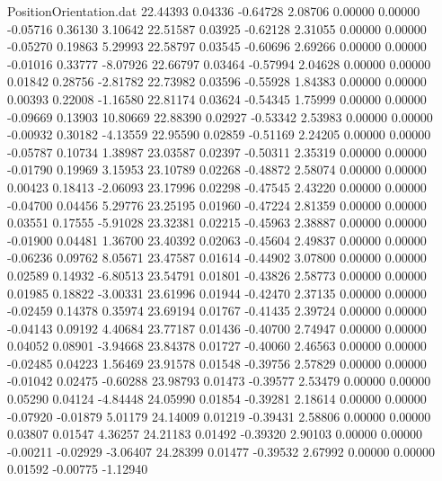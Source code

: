 \begin{filecontents}{PositionOrientation.dat}
  22.44393    0.04336   -0.64728     2.08706    0.00000    0.00000   -0.05716    0.36130    3.10642
  22.51587    0.03925   -0.62128     2.31055    0.00000    0.00000   -0.05270    0.19863    5.29993
  22.58797    0.03545   -0.60696     2.69266    0.00000    0.00000   -0.01016    0.33777   -8.07926
  22.66797    0.03464   -0.57994     2.04628    0.00000    0.00000    0.01842    0.28756   -2.81782
  22.73982    0.03596   -0.55928     1.84383    0.00000    0.00000    0.00393    0.22008   -1.16580
  22.81174    0.03624   -0.54345     1.75999    0.00000    0.00000   -0.09669    0.13903   10.80669
  22.88390    0.02927   -0.53342     2.53983    0.00000    0.00000   -0.00932    0.30182   -4.13559
  22.95590    0.02859   -0.51169     2.24205    0.00000    0.00000   -0.05787    0.10734    1.38987
  23.03587    0.02397   -0.50311     2.35319    0.00000    0.00000   -0.01790    0.19969    3.15953
  23.10789    0.02268   -0.48872     2.58074    0.00000    0.00000    0.00423    0.18413   -2.06093
  23.17996    0.02298   -0.47545     2.43220    0.00000    0.00000   -0.04700    0.04456    5.29776
  23.25195    0.01960   -0.47224     2.81359    0.00000    0.00000    0.03551    0.17555   -5.91028
  23.32381    0.02215   -0.45963     2.38887    0.00000    0.00000   -0.01900    0.04481    1.36700
  23.40392    0.02063   -0.45604     2.49837    0.00000    0.00000   -0.06236    0.09762    8.05671
  23.47587    0.01614   -0.44902     3.07800    0.00000    0.00000    0.02589    0.14932   -6.80513
  23.54791    0.01801   -0.43826     2.58773    0.00000    0.00000    0.01985    0.18822   -3.00331
  23.61996    0.01944   -0.42470     2.37135    0.00000    0.00000   -0.02459    0.14378    0.35974
  23.69194    0.01767   -0.41435     2.39724    0.00000    0.00000   -0.04143    0.09192    4.40684
  23.77187    0.01436   -0.40700     2.74947    0.00000    0.00000    0.04052    0.08901   -3.94668
  23.84378    0.01727   -0.40060     2.46563    0.00000    0.00000   -0.02485    0.04223    1.56469
  23.91578    0.01548   -0.39756     2.57829    0.00000    0.00000   -0.01042    0.02475   -0.60288
  23.98793    0.01473   -0.39577     2.53479    0.00000    0.00000    0.05290    0.04124   -4.84448
  24.05990    0.01854   -0.39281     2.18614    0.00000    0.00000   -0.07920   -0.01879    5.01179
  24.14009    0.01219   -0.39431     2.58806    0.00000    0.00000    0.03807    0.01547    4.36257
  24.21183    0.01492   -0.39320     2.90103    0.00000    0.00000   -0.00211   -0.02929   -3.06407
  24.28399    0.01477   -0.39532     2.67992    0.00000    0.00000    0.01592   -0.00775   -1.12940

\end{filecontents}
